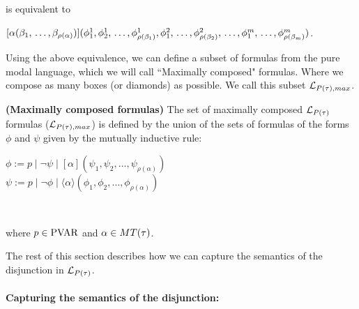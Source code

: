 \par is equivalent to 

\begin{center}

    $[\alpha(\beta_1\text{,\,}\ldots\text{,\,}\beta_{\rho(\alpha)})](\phi_1^1\text{,\,}\phi_2^1\text{,\,}\ldots \text{,\,}\phi_{\rho(\beta_1)}^1\text{,\,} \phi_1^2\text{,\,} \ldots \text{,\,}\phi_{\rho(\beta_2)}^2\text{,\,} \ldots\text{,\,} \phi_1^m \text{,\,}\ldots \text{,\,}\phi_{\rho(\beta_m)}^m)$.

\end{center}



\par Using the above equivalence, we can define a subset of formulas from the pure modal language, which we will call ``Maximally composed" formulas. Where we compose as many boxes (or diamonds) as possible. We call this subset $\mathcal{L}_{P(\tau),max}$.



\begin{definition}\label{maximally composed formulas definition - pure}
    \textbf{(Maximally composed formulas)} The set of maximally composed $\mathcal{L}_{P(\tau)}$ formulas ($\mathcal{L}_{P(\tau),max}$) is defined by the union of the sets of formulas of the forms $\phi$ and $\psi$ given by the mutually inductive rule:

    \begin{center}

        $\phi := p \mid \neg\psi \mid [\alpha](\psi_1, \psi_2, \ldots,\psi_{\rho(\alpha)})$\\

        $\psi := p \mid \neg\phi \mid \langle\alpha\rangle(\phi_1, \phi_2, \ldots,\phi_{\rho(\alpha)})$

    \end{center}\

\par where $p\in\text{PVAR}$ and $\alpha\in MT(\tau)$.

\end{definition}



\par The rest of this section describes how we can capture the semantics of the disjunction in $\mathcal{L}_{P(\tau)}$.



\paragraph{Capturing the semantics of the disjunction:}

